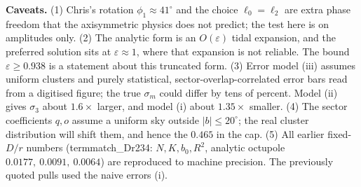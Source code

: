 \documentclass[10pt]{article}
\begin{document}
\textbf{Caveats.} (1) Chris's rotation $\phi_1\approx41^\circ$ and the choice $\ell_0=\ell_2$ are extra phase freedom that the axisymmetric physics does not predict; the test here is on amplitudes only.
(2) The analytic form is an $O(\varepsilon)$ tidal expansion, and the preferred solution sits at $\varepsilon\approx1$, where that expansion is not reliable. The bound $\varepsilon\ge0.938$ is a statement about this truncated form.
(3) Error model (iii) assumes uniform clusters and purely statistical, sector-overlap-correlated error bars read from a digitised figure; the true $\sigma_m$ could differ by tens of percent. Model (ii) gives $\sigma_3$ about $1.6\times$ larger, and model (i) about $1.35\times$ smaller.
(4) The sector coefficients $q,o$ assume a uniform sky outside $|b|\le20^\circ$; the real cluster distribution will shift them, and hence the $0.465$ in the cap.
(5) All earlier fixed-$D/r$ numbers (termmatch\_Dr234: $N,K,b_0,R^2$, analytic octupole $0.0177,\ 0.0091,\ 0.0064$) are reproduced to machine precision. The previously quoted pulls used the naive errors (i).
\end{document}

